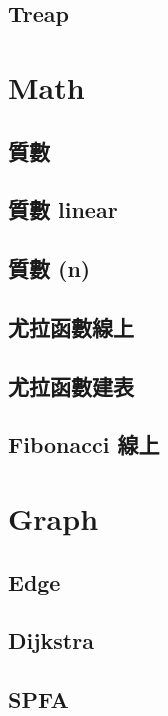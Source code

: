 \subsection{Treap}


\section{Math}
\subsection{質數}

\subsection{質數 linear}

\subsection{質數 (n)}

\subsection{尤拉函數線上}

\subsection{尤拉函數建表}

\subsection{Fibonacci 線上}


\section{Graph}
\subsection{Edge}

\subsection{Dijkstra}

\subsection{SPFA}

